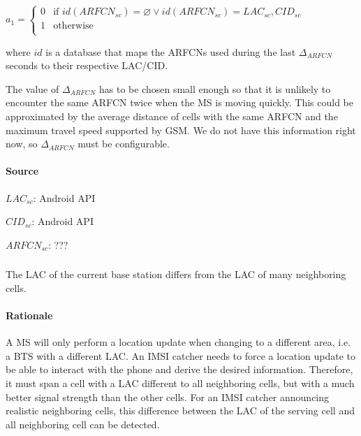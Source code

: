 \documentclass[a4paper,11pt,notitlepage,bigheadings,oneside]{scrartcl}
\begin{document}
$a_1 =
\begin{cases}
	0 & \text{if } id(ARFCN_{sc}) = \varnothing \vee id(ARFCN_{sc}) = LAC_{sc},CID_{sc} \\
	1 & \text{otherwise} \\
\end{cases}$

where $id$ is a database that maps the ARFCNs used during the last
$\Delta_{ARFCN}$ seconds to their respective LAC/CID.

The value of $\Delta_{ARFCN}$ has to be chosen small enough so that it is
unlikely to encounter the same ARFCN twice when the MS is moving quickly. This
could be approximated by the average distance of cells with the same ARFCN and
the maximum travel speed supported by GSM. We do not have this information
right now, so $\Delta_{ARFCN}$ must be configurable.

\paragraph{Source}

$LAC_{sc}$: Android API


$CID_{sc}$: Android API


$ARFCN_{sc}$: ???


\subsubsection{}

The LAC of the current base station differs from the LAC of many neighboring cells.

\paragraph{Rationale}

A MS will only perform a location update when changing to a different area,
i.e. a BTS with a different LAC. An IMSI catcher needs to force a location
update to be able to interact with the phone and derive the desired
information. Therefore, it must span a cell with a LAC different to all
neighboring cells, but with a much better signal strength than the other cells.
For an IMSI catcher announcing realistic neighboring cells, this difference
between the LAC of the serving cell and all neighboring cell can be detected.
\end{document}
